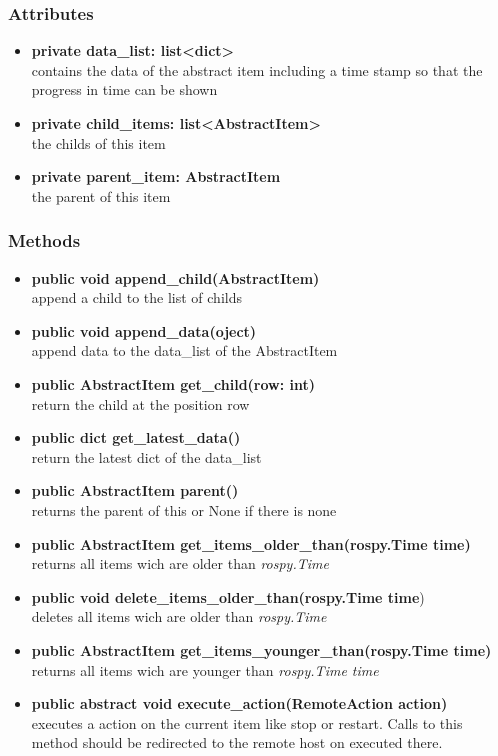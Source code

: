 \subsubsection{Attributes}
\begin{itemize}
  \item \textbf{private data\_list: list<dict>}\\ 
  contains the data of the abstract item including a time stamp so that
  the progress in time can be shown
  \item \textbf{private child\_items: list<AbstractItem>}\\ 
  the childs of this item
  \item \textbf{private parent\_item: AbstractItem}\\ 
  the parent of this item
\end{itemize}
\subsubsection{Methods}
\begin{itemize}
   \item \textbf{public void append\_child(AbstractItem)}\\ 
   append a child to the list of childs
  \item \textbf{public void append\_data(oject)}\\ 
  append data to the data\_list of the AbstractItem
  \item \textbf{public AbstractItem get\_child(row: int)}\\ 
  return the child at the position row
  \item \textbf{public dict get\_latest\_data()}\\ 
  return the latest dict of the data\_list 
  \item \textbf{public AbstractItem parent()}\\ 
  returns the parent of this or None if there is none
  \item \textbf{public AbstractItem get\_items\_older\_than(rospy.Time time)}\\
  returns all items wich are older than \textit{rospy.Time}
  \item \textbf{public void delete\_items\_older\_than(rospy.Time time})\\
  deletes all items wich are older than \textit{rospy.Time}
  \item \textbf{public AbstractItem get\_items\_younger\_than(rospy.Time time)}\\
  returns all items wich are younger than \textit{rospy.Time time}
  \item \textbf{public abstract void execute\_action(RemoteAction action)}\\ 
  executes a action on the current item like stop or restart. Calls to this
  method should be redirected to the remote host on executed there.
\end{itemize}


